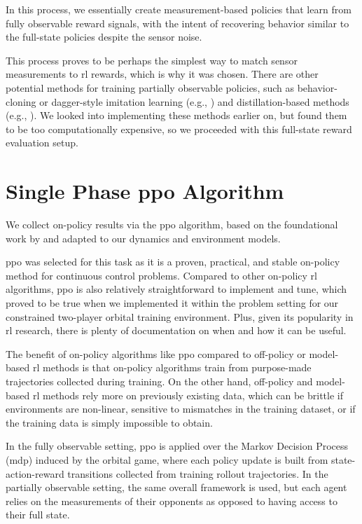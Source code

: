 In this process, we essentially create measurement-based policies that learn from fully observable reward signals, with the intent of recovering behavior similar to the full-state policies despite the sensor noise.

This process proves to be perhaps the simplest way to match sensor measurements to \acs{rl} rewards, which is why it was chosen. There are other potential methods for training partially observable policies, such as behavior-cloning or \acs{dagger}-style imitation learning (e.g., \cite{ross2011reduction}) and distillation-based methods (e.g., \cite{bajcsy2024learning}). We looked into implementing these methods earlier on, but found them to be too computationally expensive, so we proceeded with this full-state reward evaluation setup.



\section{Single Phase \acs{ppo} Algorithm}
\label{sec:single-phase-ppo}

We collect on-policy results via the \acs{ppo} algorithm, based on the foundational work by \cite{schulman2017ppo} and adapted to our dynamics and environment models.

\acs{ppo} was selected for this task as it is a proven, practical, and stable on-policy method for continuous control problems. Compared to other on-policy \acs{rl} algorithms, \acs{ppo} is also relatively straightforward to implement and tune, which proved to be true when we implemented it within the problem setting for our constrained two-player orbital training environment. Plus, given its popularity in \acs{rl} research, there is plenty of documentation on when and how it can be useful.

The benefit of on-policy algorithms like \acs{ppo} compared to off-policy or model-based \acs{rl} methods is that on-policy algorithms train from purpose-made trajectories collected during training. On the other hand, off-policy and model-based \acs{rl} methods rely more on previously existing data, which can be brittle if environments are non-linear, sensitive to mismatches in the training dataset, or if the training data is simply impossible to obtain.

In the fully observable setting, \acs{ppo} is applied over the Markov Decision Process (\acs{mdp}) induced by the orbital game, where each policy update is built from state-action-reward transitions collected from training rollout trajectories. In the partially observable setting, the same overall framework is used, but each agent relies on the measurements of their opponents as opposed to having access to their full state.



